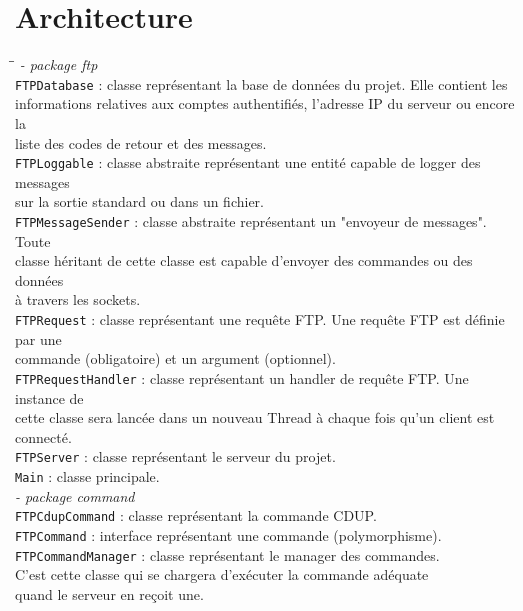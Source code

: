 \section*{Architecture}
\begin{tabbing}
	\hspace{1cm}\=\hspace{1cm}\=\kill
	\textit{- package ftp}\\
		\>\verb+FTPDatabase+ : classe représentant la base de données du projet. Elle contient les \\\>informations relatives aux comptes authentifiés, l'adresse IP du serveur ou encore la \\\>liste des codes de retour et des messages.\\
	\>\verb+FTPLoggable+ : classe abstraite représentant une entité capable de logger des messages \\\>sur la sortie standard ou dans un fichier.\\
	\>\verb+FTPMessageSender+ : classe abstraite représentant un "envoyeur de messages". Toute \\\>classe héritant de cette classe est capable d'envoyer des commandes ou des données \\\>à travers les sockets.\\
	\>\verb+FTPRequest+ : classe représentant une requête FTP. Une requête FTP est définie par une \\\>commande (obligatoire) et un argument (optionnel).\\
	\>\verb+FTPRequestHandler+ : classe représentant un handler de requête FTP. Une instance de \\\>cette classe sera lancée dans un nouveau Thread à chaque fois qu'un client est connecté.\\
	\>\verb+FTPServer+ : classe représentant le serveur du projet.\\
	\>\verb+Main+ : classe principale.\\
		\>\textit{- package command}\\
			\>\>\verb+FTPCdupCommand+ : classe représentant la commande CDUP.\\
			\>\>\verb+FTPCommand+ : interface représentant une commande (polymorphisme).\\
			\>\>\verb+FTPCommandManager+ : classe représentant le manager des commandes. \\\>\>C'est cette classe qui se chargera d'exécuter la commande adéquate \\\>\>quand le serveur en reçoit une.\\

\end{tabbing}
